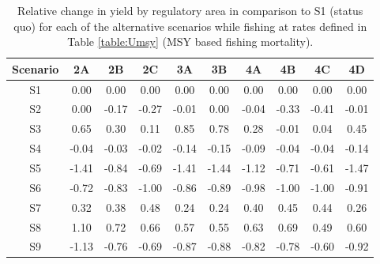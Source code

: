 \begin{table}
	\caption{Relative change in yield by regulatory area in comparison to S1 (status quo) for each of the alternative scenarios while fishing at rates defined in Table \ref{table:Umsy} (MSY based fishing mortality).}
	\label{table:MSY}
	\begin{center}
		\begin{tabular}{c|ccccccccc}
		\hline
		Scenario & 2A & 2B & 2C & 3A & 3B & 4A & 4B & 4C & 4D\\
		\hline
		S1&  0.00&  0.00&  0.00&  0.00&  0.00&  0.00&  0.00&  0.00&  0.00 \\
		S2&  0.00& -0.17& -0.27& -0.01&  0.00& -0.04& -0.33& -0.41& -0.01 \\
		S3&  0.65&  0.30&  0.11&  0.85&  0.78&  0.28& -0.01&  0.04&  0.45 \\
		S4& -0.04& -0.03& -0.02& -0.14& -0.15& -0.09& -0.04& -0.04& -0.14 \\
		S5& -1.41& -0.84& -0.69& -1.41& -1.44& -1.12& -0.71& -0.61& -1.47 \\
		S6& -0.72& -0.83& -1.00& -0.86& -0.89& -0.98& -1.00& -1.00& -0.91 \\
		S7&  0.32&  0.38&  0.48&  0.24&  0.24&  0.40&  0.45&  0.44&  0.26 \\
		S8&  1.10&  0.72&  0.66&  0.57&  0.55&  0.63&  0.69&  0.49&  0.60 \\
		S9& -1.13& -0.76& -0.69& -0.87& -0.88& -0.82& -0.78& -0.60& -0.92 \\
		\hline
		\end{tabular}
	\end{center}
\end{table}

